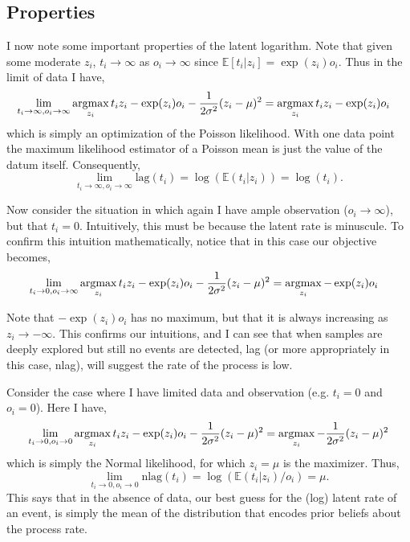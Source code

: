 \documentclass[11pt]{article}
\newcommand{\argmax}{\operatornamewithlimits{argmax}}
\begin{document}
\subsection{Properties}

I now note some important properties of the latent logarithm. Note that given some moderate $z_i$, $t_i \rightarrow \infty$ as $o_i \rightarrow \infty$ since $\mathbb{E}[t_i|z_i] = \exp(z_i)o_i$. Thus in the limit of data I have, 
\begin{align*}
&  \lim_{t_i \to \infty, o_i \to \infty} \argmax_{z_i} t_i z_i - \exp(z_i)o_i -\frac{1}{2\sigma^2}(z_i - \mu)^2 = \argmax_{z_i} t_i z_i - \exp(z_i)o_i
\end{align*}
which is simply an optimization of the Poisson likelihood. With one data point the maximum likelihood estimator of a Poisson mean is just the value of the datum itself. Consequently, 
\[
\lim_{t_i \to \infty,o_i \to \infty}\textrm{lag}(t_i) = \log(\mathbb{E}(t_i|z_i)) = \log(t_i).   
\]

Now consider the situation in which again I have ample observation ($o_i \rightarrow \infty$), but that $t_i = 0$. Intuitively, this must be because the latent rate is minuscule. To confirm this intuition mathematically, notice that in this case our objective becomes, 
\begin{align*}
&  \lim_{t_i \to 0, o_i \to \infty} \argmax_{z_i} t_i z_i - \exp(z_i)o_i -\frac{1}{2\sigma^2}(z_i - \mu)^2 = \argmax_{z_i} - \exp(z_i)o_i
\end{align*}

Note that $- \exp(z_i)o_i$ has no maximum, but that it is always increasing as $z_i \rightarrow -\infty$. This confirms our intuitions, and I can see that when samples are deeply explored but still no events are detected, lag (or more appropriately in this case, nlag), will suggest the rate of the process is low.

Consider the case where I have limited data and observation (e.g. $t_i = 0$ and $o_i = 0$). Here I have, 
\[
\lim_{t_i \to 0, o_i \to 0} \argmax_{z_i} t_i z_i - \exp(z_i)o_i -\frac{1}{2\sigma^2}(z_i - \mu)^2 = \argmax_{z_i} -\frac{1}{2\sigma^2}(z_i - \mu)^2
\]
which is simply the Normal likelihood, for which $z_i = \mu$ is the maximizer. Thus,
\[
\lim_{t_i \to 0,o_i \to 0}\textrm{nlag}(t_i) = \log(\mathbb{E}(t_i|z_i)/o_i) = \mu.   
\]
This says that in the absence of data, our best guess for the (log) latent rate of an event, is simply the mean of the distribution that encodes prior beliefs about the process rate.
\end{document}
